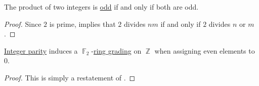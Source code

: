 \begin{proposition}\label{thm:integer_product_parity}
  The product of two integers is \hyperref[def:integer_parity]{odd} if and only if both are odd.
\end{proposition}
\begin{proof}
  Since \( 2 \) is prime,  implies that \( 2 \) divides \( nm \) if and only if \( 2 \) divides \( n \) or \( m \).
\end{proof}

\begin{corollary}\label{thm:integer_parity_grading}
  \hyperref[def:integer_parity]{Integer parity} induces a \( \BbbF_2 \)-\hyperref[def:graded_ring]{ring grading} on \( \BbbZ \) when assigning even elements to \( 0 \).
\end{corollary}
\begin{proof}
  This is simply a restatement of .
\end{proof}

